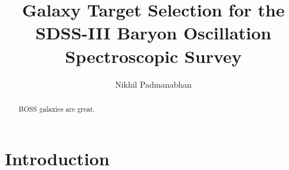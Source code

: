 \documentclass[preprint]{aastex}
\begin{document}
\topmargin-1cm
\linenumbers


\title{Galaxy Target Selection for the SDSS-III Baryon Oscillation Spectroscopic
        Survey}


\author{Nikhil Padmanabhan}




\begin{abstract}
BOSS galaxies are great. 
\end{abstract}



\section{Introduction}
\end{document}
